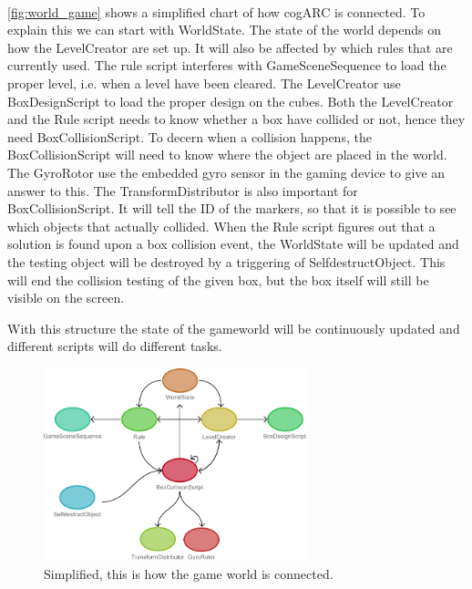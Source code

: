 \paragraph{}
\autoref{fig:world_game} shows a simplified chart of how cogARC is connected.
To explain this we can start with WorldState. The state of the world depends on
how the LevelCreator are set up. It will also be affected by which rules that
are currently used. 
The rule script interferes with GameSceneSequence to load the proper level,
i.e. when a level have been cleared. The LevelCreator use BoxDesignScript to
load the proper design on the cubes.
Both the LevelCreator and the Rule script needs to know whether a box have
collided or not, hence they need BoxCollisionScript. To decern when a collision
happens, the BoxCollisionScript will need to know where the object are placed
in the world. The GyroRotor use the embedded gyro sensor in the gaming device
to give an answer to this. The TransformDistributor is also important for 
BoxCollisionScript. It will tell the ID of the markers, so that it is possible
to see which objects that actually collided. When the Rule script figures out
that a solution is found upon a box collision event, the WorldState will be
updated and the testing object will be destroyed by a triggering of
SelfdestructObject. This will end the collision testing of the given box, but 
the box itself will still be visible on the screen.

With this structure the state of the gameworld will be continuously updated
and different scripts will do different tasks.

\begin{figure}[h!]
        \capstart
        \centering
        \includegraphics[width=0.68\textwidth]{images/game_world_class_chart}
        \caption[World game class chart]{Simplified, this is how the game world is connected.}
        \label{fig:world_game}
\end{figure}